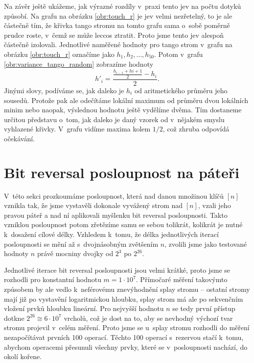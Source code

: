 
Na závěr ještě ukážeme, jak výrazné rozdíly v~praxi tento jev na počtu dotyků
způsobí. Na grafu na obrázku \ref{obr:touch_r} je jev velmi nezřetelný, to je ale
částečně tím, že křivka tango stromu na tomto grafu sama o~sobě poměrně prudce
roste, v~čemž se může leccos ztratit. Proto jsme tento jev alespoň částečně
izolovali. Jednotlivé naměřené hodnoty pro tango strom v~grafu na obrázku
\ref{obr:touch_r} označíme jako $h_1, h_2, \dots, h_{50}$. Potom v~grafu
\ref{obr:variance_tango_random} zobrazíme hodnoty $$h'_i =
\frac{\frac{h_{i-1}+h{i+1}}2-h_i}2.$$ Jinými slovy, podíváme se, jak daleko je
$h_i$ od aritmetického průměru jeho sousedů. Protože pak ale odečítáme lokální
maximum od průměru dvou lokálních minim nebo naopak, výslednou hodnotu ještě
vydělíme dvěma. Tím dostaneme určitou představu o~tom, jak daleko je daný
vzorek od v~nějakém smyslu vyhlazené křivky. V~grafu vidíme maxima kolem $1/2$,
což zhruba odpovídá očekávání. 

\section{Bit reversal posloupnost na páteři}

V~této sekci prozkoumáme posloupnost, která nad danou množinou klíčů $[n]$
vznikla tak, že jsme vystavěli dokonale vyvážený strom nad $[n]$, vzali jeho
pravou páteř a nad ní aplikovali myšlenku bit reversal posloupnosti. Takto
vzniklou posloupnost potom zřetězíme samu se sebou tolikrát, kolikrát je nutné
k~dosažení cílové délky. Vzhledem k~tomu, že délka jednotlivých iterací
posloupnosti se mění až s~dvojnásobným zvětšením $n$, zvolili jsme jako
testované hodnoty $n$ právě mocniny dvojky od $2^3$ po $2^{26}$.

Jednotlivé iterace bit reversal posloupnosti jsou velmi krátké, proto jsme se
rozhodli pro konstantní hodnotu $m=1\cdot10^7$. Přímočaré měření takovýmto
způsobem by ale vedlo k~neférovému znevýhodnění splay stromu -- ostatní stromy
mají již po vystavění logaritmickou hloubku, splay strom má ale po sekvenčním
vložení prvků hloubku lineární. Pro nejvyšší hodnotu $n$ se tedy první přístup
dotkne $2^{26} \cong 6\cdot10^7$ vrcholů, což je dost na to, aby se nevhodný
výchozí tvar stromu projevil v~celém měření. Proto jsme se u~splay stromu
rozhodli do měření nezapočítávat prvních 100 operací. Těchto 100 operací
s~rezervou stačí k~tomu, abychom operacemi  přesunuli všechny prvky,
které se v~posloupnosti nachází, do okolí kořene.

